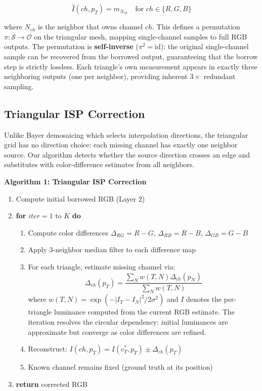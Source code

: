 \documentclass[10pt,twocolumn,letterpaper]{article}
\begin{document}
\begin{equation}
\hat{I}(ch, p_T) = m_{N_{ch}} \quad \text{for } ch \in \{R,G,B\}
\end{equation}

where $N_{ch}$ is the neighbor that owns channel $ch$. This defines a permutation $\pi: \mathcal{S} \to \mathcal{O}$ on the triangular mesh, mapping single-channel samples to full RGB outputs. The permutation is \textbf{self-inverse} ($\pi^2 = \text{id}$): the original single-channel sample can be recovered from the borrowed output, guaranteeing that the borrow step is strictly lossless. Each triangle's own measurement appears in exactly three neighboring outputs (one per neighbor), providing inherent $3\times$ redundant sampling.

\subsection{Triangular ISP Correction}

Unlike Bayer demosaicing which selects interpolation directions, the triangular grid has no direction choice: each missing channel has exactly one neighbor source. Our algorithm detects whether the source direction crosses an edge and substitutes with color-difference estimates from all neighbors.

\begin{small}
\textbf{Algorithm 1: Triangular ISP Correction}
\begin{enumerate}[nosep]
\item Compute initial borrowed RGB (Layer 2)
\item \textbf{for} $iter = 1$ to $K$ \textbf{do}
  \begin{enumerate}[nosep]
  \item Compute color differences $\Delta_{RG} = R-G$, $\Delta_{RB} = R-B$, $\Delta_{GB} = G-B$
  \item Apply 3-neighbor median filter to each difference map
  \item For each triangle, estimate missing channel via:
  \begin{equation}
  \Delta_{ch}(p_T) = \frac{\sum_{N} w(T,N) \Delta_{ch}(p_N)}{\sum_{N} w(T,N)}
  \end{equation}
  where $w(T,N) = \exp(-|I_T - I_N|^2 / 2\sigma^2)$ and $I$ denotes the per-triangle luminance computed from the current RGB estimate. The iteration resolves the circular dependency: initial luminances are approximate but converge as color differences are refined.
  \item Reconstruct: $I(ch, p_T) = I(c^*_T, p_T) \pm \Delta_{ch}(p_T)$
  \item Known channel remains fixed (ground truth at its position)
  \end{enumerate}
\item \textbf{return} corrected RGB
\end{enumerate}
\end{small}
\end{document}
